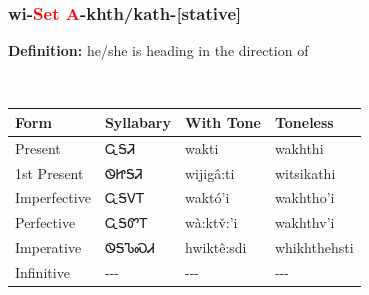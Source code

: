 \subsubsection*{wi{-}\textcolor{Red}{Set A}{-}\textbf{khth/kath}{-}[stative]}
\nopagebreak
\textbf{Definition: } he/she is heading in the direction of
\\[0.5em]
\begin{tabularx}{\textwidth}{l X X X}%
\toprule%
\textbf{Form}&\textbf{Syllabary}&\textbf{With Tone}&\textbf{Toneless}\\%
\midrule%
Present&ᏩᎦᏘ&wakti&wakhthi\\%
1st Present&ᏫᏥᎦᏘ&wijigâ:ti&witsikathi\\%
Imperfective&ᏩᎦᏙᎢ&waktó’i&wakhtho'i\\%
Perfective&ᏩᎦᏛᎢ&wà:ktv̌:’i&wakhthv'i\\%
Imperative&ᏫᎦᏖᏍᏗ&hwiktê:sdi&whikhthehsti\\%
Infinitive&{-}{-}{-}&{-}{-}{-}&{-}{-}{-}\\%
\bottomrule%
\end{tabularx}
\\[1em]